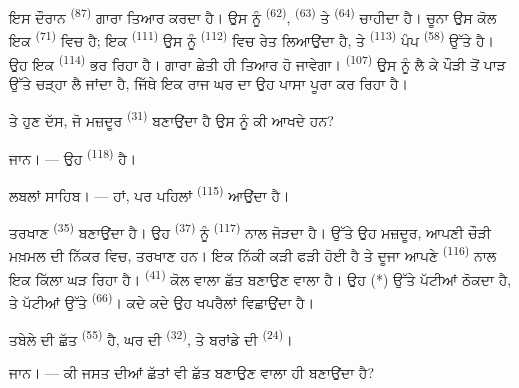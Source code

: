 ਇਸ ਦੌਰਾਨ  \textsuperscript{(87)} ਗਾਰਾ ਤਿਆਰ ਕਰਦਾ ਹੈ। ਉਸ
ਨੂੰ  \textsuperscript{(62)},  \textsuperscript{(63)} ਤੇ
 \textsuperscript{(64)} ਚਾਹੀਦਾ ਹੈ। ਚੂਨਾ ਉਸ ਕੋਲ ਇਕ 
\textsuperscript{(71)} ਵਿਚ ਹੈ; ਇਕ  \textsuperscript{(111)} ਉਸ
ਨੂੰ  \textsuperscript{(112)} ਵਿਚ ਰੇਤ ਲਿਆਉਂਦਾ ਹੈ, ਤੇ 
\textsuperscript{(113)} ਪੰਪ \textsuperscript{(58)} ਉੱਤੇ ਹੈ। ਉਹ ਇਕ 
\textsuperscript{(114)} ਭਰ ਰਿਹਾ ਹੈ। ਗਾਰਾ ਛੇਤੀ ਹੀ ਤਿਆਰ ਹੋ ਜਾਵੇਗਾ।
 \textsuperscript{(107)} ਉਸ ਨੂੰ ਲੈ ਕੇ ਪੌੜੀ ਤੋਂ ਪਾੜ ਉੱਤੇ
ਚੜ੍ਹਾ ਲੈ ਜਾਂਦਾ ਹੈ, ਜਿੱਥੇ ਇਕ ਰਾਜ ਘਰ ਦਾ ਉਹ ਪਾਸਾ ਪੂਰਾ ਕਰ ਰਿਹਾ ਹੈ।

ਤੇ ਹੁਣ ਦੱਸ, ਜੋ ਮਜ਼ਦੂਰ  \textsuperscript{(31)} ਬਣਾਉਂਦਾ ਹੈ ਉਸ ਨੂੰ ਕੀ
ਆਖਦੇ ਹਨ?

\textsc{ਜਾਨ}। --- ਉਹ  \textsuperscript{(118)} ਹੈ।

\VUsaut{3.0mm}
\VUsaut{3.0mm}

\textsc{ਲਬਲਾਂ ਸਾਹਿਬ}। --- ਹਾਂ, ਪਰ ਪਹਿਲਾਂ  \textsuperscript{(115)}
ਆਉਂਦਾ ਹੈ।

ਤਰਖਾਣ  \textsuperscript{(35)} ਬਣਾਉਂਦਾ ਹੈ। ਉਹ
 \textsuperscript{(37)} ਨੂੰ  \textsuperscript{(117)}
ਨਾਲ ਜੋੜਦਾ ਹੈ। ਉੱਤੇ ਉਹ ਮਜ਼ਦੂਰ, ਆਪਣੀ ਚੌੜੀ ਮਖ਼ਮਲ ਦੀ ਨਿੱਕਰ ਵਿਚ, ਤਰਖਾਣ ਹਨ। ਇਕ ਨਿੱਕੀ
ਕੜੀ ਫੜੀ ਹੋਈ ਹੈ ਤੇ ਦੂਜਾ ਆਪਣੇ  \textsuperscript{(116)} ਨਾਲ ਇਕ ਕਿੱਲਾ
ਘੜ ਰਿਹਾ ਹੈ।  \textsuperscript{(41)} ਕੋਲ ਵਾਲਾ ਛੱਤ ਬਣਾਉਣ ਵਾਲਾ ਹੈ। ਉਹ
 (*) ਉੱਤੇ ਪੱਟੀਆਂ ਠੋਕਦਾ ਹੈ, ਤੇ ਪੱਟੀਆਂ ਉੱਤੇ 
\textsuperscript{(66)}। ਕਦੇ ਕਦੇ ਉਹ ਖਪਰੈਲਾਂ ਵਿਛਾਉਂਦਾ ਹੈ।


ਤਬੇਲੇ ਦੀ ਛੱਤ  \textsuperscript{(55)} ਹੈ, ਘਰ ਦੀ
 \textsuperscript{(32)}, ਤੇ ਬਰਾਂਡੇ ਦੀ 
\textsuperscript{(24)}।

\textsc{ਜਾਨ}। --- ਕੀ ਜਸਤ ਦੀਆਂ ਛੱਤਾਂ ਵੀ ਛੱਤ ਬਣਾਉਣ ਵਾਲਾ ਹੀ ਬਣਾਉਂਦਾ ਹੈ?


